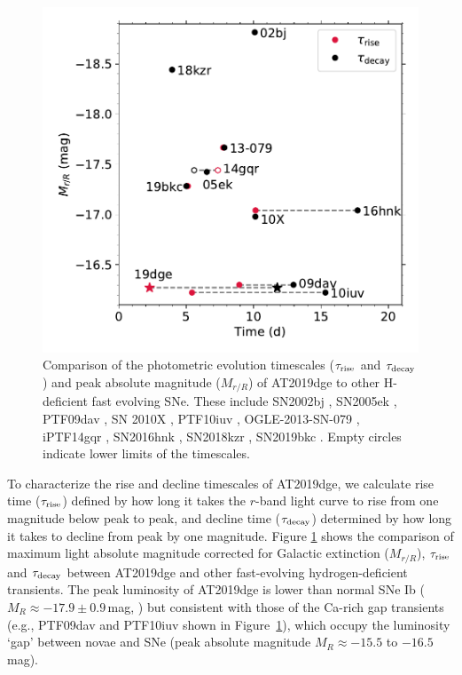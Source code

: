 \documentclass[twocolumn]{aastex63}
\begin{document}
\begin{CJK*}{UTF8}{gbsn}
\begin{figure}[htbp!]
	\centering
	\includegraphics[width=\columnwidth]{figures/compare_mag.pdf}
	\caption{Comparison of the photometric evolution timescales ($\tau_{\rm rise}$ and $\tau_{\rm  
			decay}$) and peak absolute magnitude ($M_{r/R}$) of AT2019dge to other H-deficient fast 
			evolving 
		SNe. 
		These include 
		SN2002bj \citep{Poznanski2010},
		SN2005ek \citep{Drout2013}, 
		PTF09dav \citep{Sullivan2011}, 
		SN 2010X \citep{Kasliwal2010},
		PTF10iuv \citep{Kasliwal2012},
		OGLE-2013-SN-079 \citep{Inserra2015}, 
		iPTF14gqr \citep{De2018}, 
		SN2016hnk \citep{Galbany2019}, 
		SN2018kzr \citep{McBrien2019}, 
		SN2019bkc \citep{Chen2019}. 
		Empty circles indicate lower limits of the timescales.
		\label{fig:compare_mag}}
\end{figure}

To characterize the rise and decline timescales of AT2019dge, we calculate rise time ($\tau_{\rm rise}$) 
defined by how long it takes the $r$-band light curve to rise from one magnitude below peak to peak, 
and decline time ($\tau_{\rm decay}$) determined by how long it takes to decline from peak by one 
magnitude. Figure \ref{fig:compare_mag} shows the comparison of maximum light absolute magnitude 
corrected for Galactic extinction ($M_{r/R}$), $\tau_{\rm rise}$ and $\tau_{\rm decay}$ between 
AT2019dge and other fast-evolving hydrogen-deficient transients. The peak luminosity of AT2019dge 
is lower than normal SNe Ib ($M_R\approx -17.9\pm0.9$\,mag, \citealt{Drout2011}) but consistent with 
those of the Ca-rich gap transients (e.g., PTF09dav and PTF10iuv shown in 
Figure~\ref{fig:compare_mag}), which occupy the luminosity `gap' between novae and SNe (peak 
absolute magnitude $M_R \approx -15.5$ to $-16.5$\,mag).


\end{CJK*}
\end{document}
